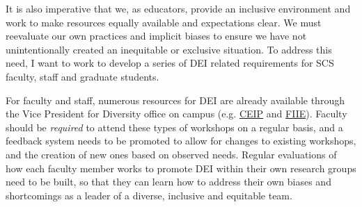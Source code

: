 \documentclass[11pt]{article}
\begin{document}

















It is also imperative that we, as educators, provide an inclusive environment and work to make resources equally available and expectations clear. We must reevaluate our own practices and implicit biases to ensure we have not unintentionally created an inequitable or exclusive situation. To address this need, I want to work to develop a series of DEI related requirements for SCS faculty, staff and graduate students. 

For faculty and staff, numerous resources for DEI are already available through the Vice President for Diversity office on campus (e.g. \href{https://diversity.colostate.edu/our-programs/#1504017838903-86d3213a-2d2c}{CEIP} and \href{https://diversity.colostate.edu/our-programs/#1504017838952-75b4d525-fe10}{FIIE}). Faculty should be \emph{required} to attend these types of workshops on a regular basis, and a feedback system needs to be promoted to allow for changes to existing workshops, and the creation of new ones based on observed needs. Regular evaluations of how each faculty member works to promote DEI within their own research groups need to be built, so that they can learn how to address their own biases and shortcomings as a leader of a diverse, inclusive and equitable team.
\end{document}
